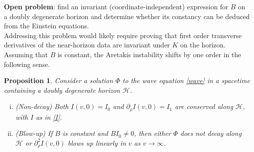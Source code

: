\documentclass[11pt, reqno]{amsart}
\theoremstyle{plain}
\newtheorem{prop}[theorem]{Proposition}
\theoremstyle{definition}
\numberwithin{equation}{section}
\begin{document}
\noindent \textbf{Open problem}: find an invariant (coordinate-independent) expression for $B$ on a doubly degenerate horizon and determine whether its constancy can be deduced from the Einstein equations.\\

Addressing this problem would likely require proving that first order transverse derivatives of the near-horizon data are invariant under $K$ on the horizon. Assuming that $B$ is constant, the Aretakis instability shifts by one order in the following sense.

\begin{prop} \label{areprop}
    Consider a solution $\Phi$ to the wave equation \eqref{wave} in a spacetime containing a doubly degenerate horizon $\mathcal{H}$.
    \begin{enumerate}[(i)]
        \item \textup{(Non-decay)} Both $I(v,0) = I_0$ and $\partial_\rho I(v,0) = I_1$ are conserved along $\mathcal{H}$, with $I$ as in \eqref{I}.
        \item \textup{(Blow-up)} If $B$ is constant and $BI_0 \neq 0$, then either $\Phi$ does not decay along $\mathcal{H}$ or $\partial_\rho^2 I(v,0)$ blows up linearly in $v$ as $v \to \infty$.
    \end{enumerate}
\end{prop}
\end{document}
